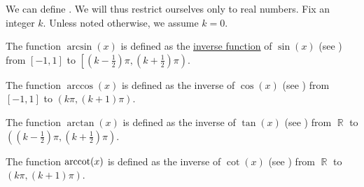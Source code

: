 \begin{definition}\label{def:inverse_trigonometric_functions}
  We can define . We will thus restrict ourselves only to real numbers. Fix an integer \( k \). Unless noted otherwise, we assume \( k = 0 \).

  \begin{thmenum}
     The  function \( \arcsin(x) \) is defined as the \hyperref[def:set_valued_map/inverse]{inverse function} of \( \sin(x) \) (see ) from \( [-1, 1] \) to \( \left[(k - \tfrac 1 2) \pi, (k + \tfrac 1 2) \pi \right) \).

     The  function \( \arccos(x) \) is defined as the inverse of \( \cos(x) \) (see ) from \( [-1, 1] \) to \( (k\pi, (k + 1)\pi) \).

     The  function \( \arctan(x) \) is defined as the inverse of \( \tan(x) \) (see ) from \( \BbbR \) to \( \left((k - \tfrac 1 2) \pi, (k + \tfrac 1 2) \pi \right) \).

     The  function \( \operatorname{arccot}(x) \) is defined as the inverse of \( \cot(x) \) (see ) from \( \BbbR \) to \( (k\pi, (k + 1)\pi) \).
  \end{thmenum}
\end{definition}

